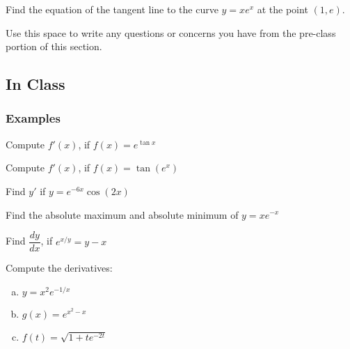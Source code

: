 \documentclass[notes]{subfiles}
\begin{document}
		\begin{ex}
			Find the equation of the tangent line to the curve $y = xe^x$ at the point $(1,e)$.
		\end{ex}
			
		\begin{question}
			Use this space to write any questions or concerns you have from the pre-class portion of this section.
		\end{question}
			\newpage
			
	\subsection*{In Class}
	\subsubsection*{Examples}
		\begin{ex}
			Compute $f'(x)$, if $f(x) = e^{\tan x}$
		\end{ex}
			
		\begin{ex}
			Compute $f'(x)$, if $f(x) = \tan (e^x)$
		\end{ex}
			
		\begin{ex}
			Find $y'$ if $y = e^{-6x}\cos(2x)$
		\end{ex}
			
		\begin{ex}
			Find the absolute maximum and absolute minimum of $y = xe^{-x}$
		\end{ex}
			\newpage
			
		\begin{ex}
			Find $\dfrac{dy}{dx}$, if $e^{x/y} = y - x$
		\end{ex}
			
		\begin{ex}
			Compute the derivatives:
			\begin{enumerate}[(a)]
				\item $y = x^2e^{-1/x}$
					
				\item $g(x) = e^{x^2-x}$
					
				\item $f(t) = \sqrt{1+te^{-2t}}$
			\end{enumerate}
		\end{ex}
			\newpage
			
\end{document}
